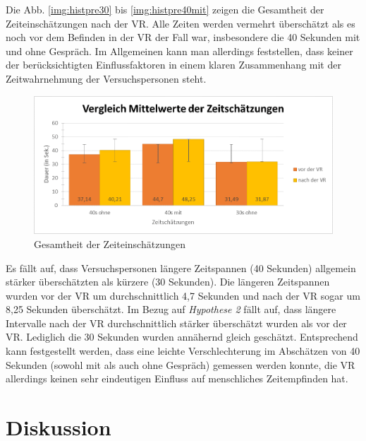 \documentclass{Paper}
\begin{document}
Die Abb. \ref{img:histpre30} bis \ref{img:histpre40mit} zeigen die Gesamtheit der Zeiteinschätzungen nach der VR. Alle Zeiten werden vermehrt überschätzt als es noch vor dem Befinden in der VR der Fall war, insbesondere die 40 Sekunden mit und ohne Gespräch. Im Allgemeinen kann man allerdings feststellen, dass keiner der berücksichtigten Einflussfaktoren in einem klaren Zusammenhang mit der Zeitwahrnehmung der Versuchspersonen steht.


\begin{figure}[H]
	\centering
	\includegraphics[scale=0.7]{../Diagramme/zeitschaetzungen/vergleich.png}
	\caption{Gesamtheit der Zeiteinschätzungen}
	\label{zeiteinschaetzungen}
\end{figure}


Es fällt auf, dass Versuchspersonen längere Zeitspannen (40 Sekunden) allgemein stärker überschätzten als kürzere (30 Sekunden). Die längeren Zeitspannen wurden vor der VR um durchschnittlich 4,7 Sekunden und nach der VR sogar um 8,25 Sekunden überschätzt.
Im Bezug auf \textit{Hypothese 2} fällt auf, dass längere Intervalle nach der VR durchschnittlich stärker überschätzt wurden als vor der VR. Lediglich die 30 Sekunden wurden annähernd gleich geschätzt. Entsprechend kann festgestellt werden, dass eine leichte Verschlechterung im Abschätzen von 40 Sekunden (sowohl mit als auch ohne Gespräch) gemessen werden konnte, die VR allerdings keinen sehr eindeutigen Einfluss auf menschliches Zeitempfinden hat.

       



\section{Diskussion}


\end{document}
